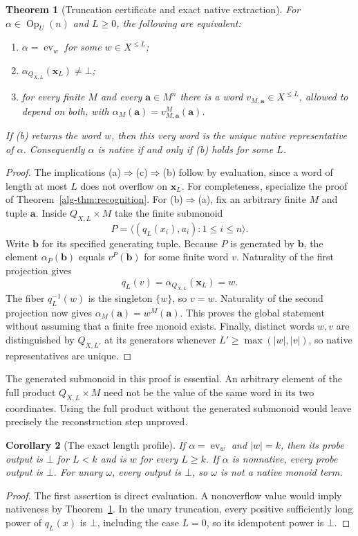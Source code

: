 \documentclass[11pt]{article}
\newtheorem{theorem}{Theorem}[section]
\newtheorem{corollary}[theorem]{Corollary}
\theoremstyle{definition}
\theoremstyle{remark}
\newcommand{\Op}{\operatorname{Op}}
\newcommand{\ev}{\operatorname{ev}}
\begin{document}
\begin{theorem}[Truncation certificate and exact native extraction]
\label{mon-thm:probe}
For $\alpha\in\Op_U(n)$ and $L\geq0$, the following are equivalent:
\begin{enumerate}[label=(\alph*)]
\item $\alpha=\ev_w$ for some $w\in X^{\leq L}$;
\item $\alpha_{Q_{X,L}}(\mathbf x_L)\ne\bot$;
\item for every finite $M$ and every $\mathbf a\in M^n$ there is a word
      $v_{M,\mathbf a}\in X^{\leq L}$, allowed to depend on both,
      with $\alpha_M(\mathbf a)=v_{M,\mathbf a}^M(\mathbf a)$.
\end{enumerate}
If (b) returns the word $w$, then this very word is the unique native
representative of $\alpha$. Consequently $\alpha$ is native if and only
if (b) holds for some $L$.
\end{theorem}
\begin{proof}
The implications (a)$\Rightarrow$(c)$\Rightarrow$(b) follow by evaluation,
since a word of length at most $L$ does not overflow on $\mathbf x_L$.
For completeness, specialize the proof of Theorem~\ref{alg-thm:recognition}.
For (b)$\Rightarrow$(a), fix an arbitrary finite $M$ and tuple $\mathbf a$.
Inside $Q_{X,L}\times M$ take the finite submonoid
\[
 P=\langle(q_L(x_i),a_i):1\leq i\leq n\rangle.
\]
Write $\mathbf b$ for its specified generating tuple. Because $P$ is
generated by $\mathbf b$, the element $\alpha_P(\mathbf b)$ equals
$v^P(\mathbf b)$ for some finite word $v$. Naturality of the first
projection gives
\[
 q_L(v)=\alpha_{Q_{X,L}}(\mathbf x_L)=w.
\]
The fiber $q_L^{-1}(w)$ is the singleton $\{w\}$, so $v=w$.
Naturality of the second projection now gives
$\alpha_M(\mathbf a)=w^M(\mathbf a)$. This proves the global statement
without assuming that a finite free monoid exists. Finally, distinct
words $w,v$ are distinguished by $Q_{X,L'}$ at its generators whenever
$L'\geq\max(|w|,|v|)$, so native representatives are unique.
\end{proof}

The generated submonoid in this proof is essential. An arbitrary element
of the full product $Q_{X,L}\times M$ need not be the value of the same
word in its two coordinates. Using the full product without the generated
submonoid would leave precisely the reconstruction step unproved.

\begin{corollary}[The exact length profile]
\label{mon-cor:length}
If $\alpha=\ev_w$ and $|w|=k$, then its probe output is $\bot$ for
$L<k$ and is $w$ for every $L\geq k$. If $\alpha$ is nonnative, every
probe output is $\bot$. For unary $\omega$, every output is $\bot$,
so $\omega$ is not a native monoid term.
\end{corollary}
\begin{proof}
The first assertion is direct evaluation. A nonoverflow value would imply
nativeness by Theorem~\ref{mon-thm:probe}. In the unary truncation, every
positive sufficiently long power of $q_L(x)$ is $\bot$, including the
case $L=0$, so its idempotent power is $\bot$.
\end{proof}
\end{document}
